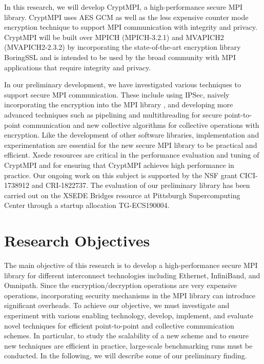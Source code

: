 In this research, we will develop CryptMPI, a high-performance secure MPI library.
CryptMPI uses AES GCM as well as the less expensive counter mode encryption technique
to support MPI communication with integrity and privacy.
CryptMPI will be built over MPICH (MPICH-3.2.1) and MVAPICH2 (MVAPICH2-2.3.2)
by incorporating the state-of-the-art encryption library BoringSSL and is intended
to be used by the broad community with MPI applications that require integrity
and privacy.

In our preliminary development, we have investigated various techniques to support
secure MPI communication. These include using IPSec, naively incorporating the
encryption into the MPI library \cite{Cluster:Naser19}, and developing more
advanced techniques such as pipelining and multithreading for secure
point-to-point communication and new collective algorithms for collective operations
with encryption. Like the development of other software libraries, implementation and
experimentation are essential for the new secure MPI library to be
practical and efficient. Xsede resources are critical in the performance
evaluation and tuning of CryptMPI and for ensuring that CryptMPI achieves high performance
in practice. Our ongoing work on this subject is supported by the NSF grant
CICI-1738912 and CRI-1822737. The evaluation of our preliminary library has been carried
out on the XSEDE Bridges resource at Pittsburgh Supercomputing Center through a
startup allocation TG-ECS190004. 

\section{Research Objectives}

The main objective of this research is to develop a high-performance secure MPI
library for different interconnect technologies including Ethernet, InfiniBand, and
Omnipath. Since the encryption/decryption operations are very expensive operations,
incorporating security mechanisms in the MPI library can introduce significant
overheads. To achieve our objective, we must investigate and experiment with various
enabling technology, develop, implement, and evaluate novel techniques for efficient
point-to-point and collective communication schemes. In particular, to study the
scalability of a new scheme and to ensure new techniques are efficient in practice,
large-scale benchmarking runs must be conducted. In the following, we will describe
some of our preliminary finding. 

